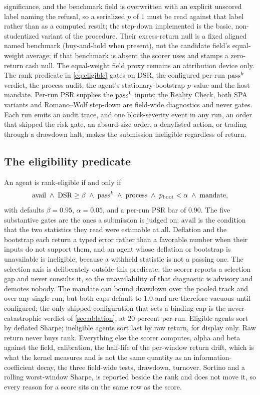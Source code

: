 significance, and the benchmark field is overwritten with an explicit unscored label naming the refusal, so a serialized $p$ of $1$ must be read against that label rather than as a computed result; the step-down implemented is the basic, non-studentized variant of the procedure. Their excess-return null is a fixed aligned named benchmark (buy-and-hold when present), not the candidate field's equal-weight average; if that benchmark is absent the scorer uses and stamps a zero-return cash null. The equal-weight field proxy remains an attribution device only. The rank predicate in \cref{eq:eligible} gates on DSR, the configured per-run $\text{pass}^{k}$ verdict, the process audit, the agent's stationary-bootstrap $p$-value and the host mandate. Per-run PSR supplies the $\text{pass}^{k}$ inputs; the Reality Check, both SPA variants and Romano--Wolf step-down are field-wide diagnostics and never gates. Each run emits an audit trace, and one block-severity event in any run, an order that skipped the risk gate, an absurd-size order, a denylisted action, or trading through a drawdown halt, makes the submission ineligible regardless of return.

\subsection{The eligibility predicate}\label{sec:predicate}

An agent is rank-eligible if and only if
\begin{equation}\label{eq:eligible}
\text{avail} \;\wedge\; \text{DSR} \ge \beta \;\wedge\; \text{pass}^{k} \;\wedge\; \text{process} \;\wedge\; p_{\text{boot}} < \alpha \;\wedge\; \text{mandate},
\end{equation}
with defaults $\beta = 0.95$, $\alpha = 0.05$, and a per-run PSR bar of $0.90$. The five substantive gates are the ones a submission is judged on; $\text{avail}$ is the condition that the two statistics they read were estimable at all. Deflation and the bootstrap each return a typed error rather than a favorable number when their inputs do not support them, and an agent whose deflation or bootstrap is unavailable is ineligible, because a withheld statistic is not a passing one. The selection axis is deliberately outside this predicate: the scorer reports a selection gap and never consults it, so the unavailability of that diagnostic is advisory and demotes nobody. The mandate can bound drawdown over the pooled track and over any single run, but both caps default to $1.0$ and are therefore vacuous until configured; the only shipped configuration that sets a binding cap is the never-catastrophic verdict of \cref{sec:ablation}, at 20 percent per run. Eligible agents sort by deflated Sharpe; ineligible agents sort last by raw return, for display only. Raw return never buys rank. Everything else the scorer computes, alpha and beta against the field, calibration, the half-life of the per-window return drift, which is what the kernel measures and is not the same quantity as an information-coefficient decay, the three field-wide tests, drawdown, turnover, Sortino \citep{sortino1991downside} and a rolling worst-window Sharpe, is reported beside the rank and does not move it, so every reason for a score sits on the same row as the score.

